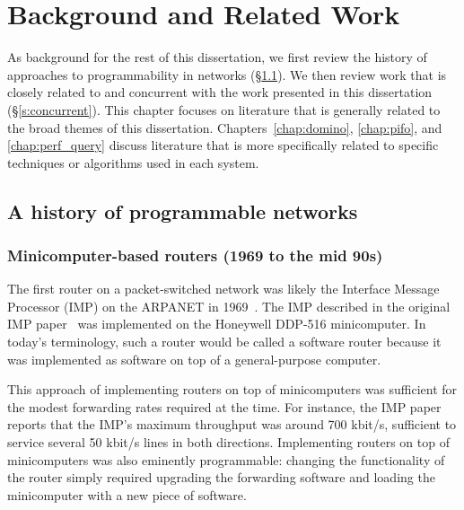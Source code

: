 \chapter{Background and Related Work}
\label{chap:related}

As background for the rest of this dissertation, we first review the history of
approaches to programmability in networks (\S\ref{s:bgnd_bgnd}). We then review
work that is closely related to and concurrent with the work presented in this
dissertation (\S\ref{s:concurrent}).  This chapter focuses on literature that
is generally related to the broad themes of this dissertation.
Chapters~\ref{chap:domino}, \ref{chap:pifo}, and \ref{chap:perf_query} discuss
literature that is more specifically related to specific techniques or
algorithms used in each system.
%

\section{A history of programmable networks}
\label{s:bgnd_bgnd}

\subsection{Minicomputer-based routers (1969 to the mid 90s)}
The first router on a packet-switched network was likely the Interface Message
Processor (IMP) on the ARPANET in 1969~\cite{imp}. The IMP described in the
original IMP paper~\cite{imp} was implemented on the Honeywell DDP-516
minicomputer. In today's terminology, such a router would be called a software
router because it was implemented as software on top of a general-purpose
computer.

This approach of implementing routers on top of minicomputers was sufficient
for the modest forwarding rates required at the time. For instance, the IMP
paper reports that the IMP's maximum throughput was around 700 kbit/s,
sufficient to service several 50 kbit/s lines in both directions.  Implementing
routers on top of minicomputers was also eminently programmable: changing the
functionality of the router simply required upgrading the forwarding software
and loading the minicomputer with a new piece of software.

